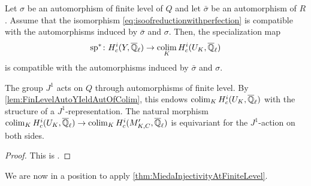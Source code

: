 \documentclass[../main.tex]{subfiles}
\begin{document}
\begin{prop}\label{prop:SpecMapIsEquivariantWithFinLev}
  Let $\sigma$ be an automorphism of finite level of $Q$ and let 
  $\bar \sigma$ be an automorphism of $R$. Assume that the isomorphism
  \eqref{eq:isoofreductionwithperfection} is compatible with the automorphisms
  induced by $\bar \sigma$ and $\sigma$. Then, the specialization map
  \begin{equation*}
    \mathrm{sp}^* \colon H^i_c(Y, {\overline {\mathbb{Q}}_\ell}) \to \operatorname*{colim}_K H^i_c(U_K, {\overline {\mathbb{Q}}_\ell})
  \end{equation*}
  is compatible with the automorphisms induced by $\bar \sigma$ and 
  $\sigma$. 
\end{prop}

\begin{prop}\label{prop:ActinOfJ1IsFinLevel}
  The group $J^1$ acts on $Q$ through automorphisms of finite level. 
  By \cref{lem:FinLevelAutoYIeldAutOfColim}, this endows $\operatorname*{colim}_K H^i_c(U_K, {\overline {\mathbb{Q}}_\ell})$
  with the structure of a $J^1$-representation. The natural morphism $\operatorname*{colim}_K
  H^i_c(U_K, {\overline {\mathbb{Q}}_\ell}) \to \operatorname*{colim}_K H^i_c(M'_{K,C}, {\overline {\mathbb{Q}}_\ell})$ is equivariant
  for the $J^1$-action on both sides.
\begin{proof}
  This is \cite[Propsition 4.5]{mieda2016geometric}.
\end{proof}
\end{prop}

We are now in a position to apply \cref{thm:MiedaInjectivityAtFiniteLevel}.
\end{document}
